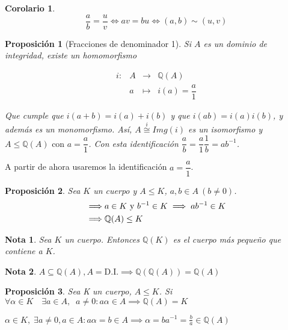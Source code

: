 \documentclass[11pt, a4paper, titlepage]{article}
\makeatletter
\renewenvironment{proof}[1][\proofname] {\vspace{-15pt}\par\pushQED{\qed}\normalfont\topsep6\p@\@plus6\p@\relax\trivlist\item[\hskip\labelsep\it#1\@addpunct{.}]\ignorespaces}{\popQED\endtrivlist\@endpefalse}
\providecommand{\rac}{\mathbb{Q}}
\theoremstyle{theorem-style}
\newtheorem*{nprop}{Proposición}
\newtheorem{ncor}{Corolario}
\theoremstyle{definition-style}
\theoremstyle{remark-style}
\newtheorem*{nota}{Nota}
\theoremstyle{example-style}
\makeatother
\begin{document}
\begin{ncor}
	\[\frac{a}{b}= \frac{u}{v} \iff av = bu \iff (a,b) \sim (u,v)\]
\end{ncor}

\begin{nprop}[Fracciones de denominador 1]
  Si $A$ es un dominio de integridad, existe un homomorfismo

  \[
  \begin{array}{llll}
    i :& A & \longrightarrow & \mathbb{Q}(A) \\
       &a & \longmapsto &  i(a) = \dfrac{a}{1}
  \end{array}
  \]

  Que cumple que $i(a+b) = i(a)+i(b)$ y que $i(ab)=i(a)i(b)$, y además es un monomorfismo.
  Así, $A \stackrel{i}{\cong} Img(i)$ es un isomorfismo y $A\le\mathbb{Q}(A) \text{ con } a=\dfrac{a}{1}$.
  Con esta identificación $\dfrac{a}{b} = \dfrac{a}{1}\dfrac{1}{b} = ab^{-1}$.
\end{nprop}

A partir de ahora usaremos la identificación $a = \dfrac{a}{1}$.

\begin{nprop}
  Sea $K$ un cuerpo y $A\le K$, $a,b\in A\ (b\not=0)$.
  \begin{align}
    \implies& a\in K \text{ y } b^{-1}\in K \implies ab^{-1}\in K\notag\\
    \implies&\mathbb{Q}(A)\le K\notag
  \end{align}
\end{nprop}

\begin{nota}
 Sea $K$ un cuerpo. Entonces  $\mathbb{Q}(K)$ es el cuerpo más pequeño que contiene a $K$.
\end{nota}

\begin{nota}
  $A \subseteq \mathbb{Q}(A), A=\text{D.I.} \implies \rac(\rac(A)) = \rac(A)$
\end{nota}


\begin{nprop}
  Sea K un cuerpo, $A\le K$. Si $\forall\alpha\in K\quad \exists a\in A,\;\; a \not= 0 : a\alpha\in A \implies \rac(A)=K$
\end{nprop}

\begin{proof}
  $\alpha\in K,\; \exists a \ne 0, a\in A : a\alpha=b\in A \implies \alpha = ba^{-1} = \frac{b}{a}\in \rac(A)$
\end{proof}
\end{document}

